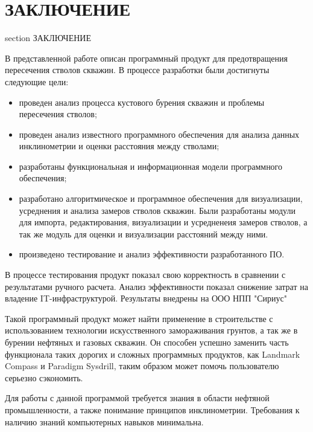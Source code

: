 \newpage
\section*{ЗАКЛЮЧЕНИЕ}
 {section} {ЗАКЛЮЧЕНИЕ}

В представленной работе описан программный продукт для предотвращения пересечения стволов скважин.
В процессе разработки были достигнуты следующие цели:

\begin{itemize}
  \item проведен анализ процесса кустового бурения скважин и проблемы пересечения стволов;
  \item проведен анализ известного программного обеспечения для анализа данных инклинометрии и оценки расстояния между стволами;
  \item разработаны функциональная и информационная модели программного обеспечения;
  \item разработано алгоритмическое и программное обеспечения для визуализации, усреднения и анализа замеров стволов скважин. Были разработаны модули для
    импорта, редактирования, визуализации и усредненеия замеров стволов, а так же модуль для оценки и визуализации расстояний между ними. 
  \item произведено тестирование и анализ эффективности разработанного ПО.
\end{itemize}

В процессе тестирования продукт показал свою корректность в сравнении с результатами ручного расчета. Анализ эффективности показал
снижение затрат на владение IT-инфраструктурой. Результаты внедрены на ООО НПП "Сириус"

Такой программный продукт может найти применение в строительстве с использованием технологии искусственного замораживания
грунтов, а так же в бурении нефтяных и газовых скважин. Он способен успешно заменить часть функционала таких дорогих и сложных
программных продуктов, как Landmark Compass и Paradigm Sysdrill, таким образом может помочь пользователю серьезно сэкономить.

Для работы с данной программой требуется знания в области нефтяной промышленности, а также понимание принципов инклинометрии.
Требования к наличию знаний компьютерных навыков минимальна.

